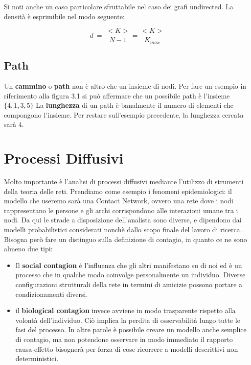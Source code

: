 \documentclass[12pt,twoside]{report}
\begin{document}
	Si noti anche un caso particolare sfruttabile nel caso dei grafi undirected. La densità è esprimibile nel modo seguente:

    \begin{equation}
        d \ = \ \frac{<K>}{N-1} = \frac{<K>}{K_{max}}
    \end{equation}
    
\subsection{Path}

    Un \textbf{cammino} o \textbf{path} non è altro che un insieme di nodi. Per fare un esempio in riferimento alla figura 3.1 si può affermare che un possibile path è l'insieme $\{4, 1, 3, 5\}$
    La \textbf{lunghezza} di un path è banalmente il numero di elementi che compongono l'insieme. Per restare sull'esempio precedente, la lunghezza cercata sarà 4.\clearpage
    
\section{Processi Diffusivi}

    Molto importante è l'analisi di processi diffusivi mediante l'utilizzo di strumenti della teoria delle reti. Prendiamo come esempio i fenomeni epidemiologici: il modello che useremo sarà una Contact Network, ovvero una rete dove i nodi rappresentano le persone e gli archi corrispondono alle interazioni umane tra i nodi. Da qui le strade a disposizione dell'analista sono diverse, e dipendono dai modelli probabilistici considerati nonchè dallo scopo finale del lavoro di ricerca. Bisogna però fare un distinguo sulla definizione di contagio, in quanto ce ne sono almeno due tipi:
    
\begin{itemize}
    \item Il \textbf{social contagion} è l'influenza che gli altri manifestano su di noi ed è un processo che in qualche modo coinvolge personalmente un individuo. Diverse configurazioni strutturali della rete in termini di amicizie possono portare a condizionamenti diversi.
    \item il \textbf{biological contagion} invece avviene in modo trasparente rispetto alla volontà dell'individuo. Ciò implica la perdita di osservabilità lungo tutte le fasi del processo. In altre parole è possibile creare un modello anche semplice di contagio, ma non potendone osservare in modo immediato il rapporto causa-effetto bisognerà per forza di cose ricorrere a modelli descrittivi non deterministici.
\end{itemize}
\end{document}

